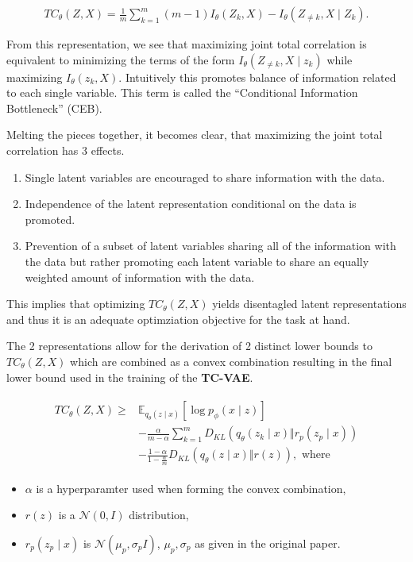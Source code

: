 \documentclass[twoside,11pt]{article}
\begin{document}
\begin{proposition}
  \begin{align*}
    TC_{\theta}(Z, X) = \frac{1}{m}\sum_{k=1}^{m}(m-1)I_{\theta}(Z_{k}, X) - I_{\theta}(Z_{\neq k}, X \mid Z_{k}).
  \end{align*}
\end{proposition}
From this representation, we see that maximizing joint total correlation is equivalent to minimizing the terms of the form $I_{\theta}(Z_{\neq k}, X \mid z_{k})$ while maximizing $I_{\theta}(z_{k}, X)$.
Intuitively this promotes balance of information related to each single variable. This term is called the \enquote{Conditional Information Bottleneck} (CEB).

Melting the pieces together, it becomes clear, that maximizing the joint total correlation has 3 effects.
\begin{enumerate}
  \item Single latent variables are encouraged to share information with the data.
  \item Independence of the latent representation conditional on the data is promoted.
  \item Prevention of a subset of latent variables sharing all of the information with the data but rather promoting each latent variable to share an equally weighted amount of information with the data.
\end{enumerate}
This implies that optimizing $TC_{\theta}(Z,X)$ yields disentagled latent representations and thus it is an adequate optimziation objective for the task at hand.

The 2 representations allow for the derivation of 2 distinct lower bounds to $TC_{\theta}(Z, X)$ which are combined as a convex combination resulting in the final lower bound used in the training of the \textbf{TC-VAE}.

\begin{definition}
  \begin{align*}
    \begin{split}
      TC_{\theta}(Z, X) \geq & \mathbb{E}_{q_{\theta}(z \mid x)}[\log p_{\phi}(x \mid z)] \\
      & - \frac{\alpha}{m - \alpha} \sum_{k=1}^{m}D_{KL}(q_{\theta}(z_{k} \mid x) \Vert r_{p}(z_{p} \mid x)) \\
      & - \frac{1 - \alpha}{1 - \frac{\alpha}{m}} D_{KL}(q_{\theta}(z \mid x) \Vert r(z)), \text{ where }
    \end{split}
  \end{align*}
  \begin{itemize}
    \item $\alpha$ is a hyperparamter used when forming the convex combination,
    \item  $r(z)$ is a $\mathcal{N}(0, I)$ distribution,
    \item $r_{p}(z_{p} \mid x)$ is  $\mathcal{N}(\mu_{p}, \sigma_{p}I)$, $\mu_{p}, \sigma_{p}$ as given in the original paper.
  \end{itemize}
\end{definition}
\end{document}
